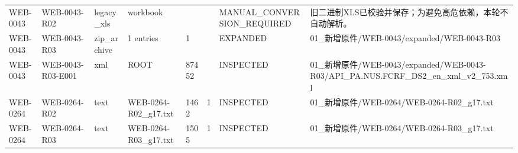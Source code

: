 \begin{landscape}
\begin{longtable}{p{1.8cm}p{2.2cm}p{3.1cm}p{4.7cm}p{1.3cm}p{1.3cm}p{3.0cm}p{5.3cm}}
WEB-0043 & WEB-0043-R02 & legacy\_\allowbreak{}xls & workbook &  &  & MANUAL\_\allowbreak{}CONVERSION\_\allowbreak{}REQUIRED & 旧二进制XLS已校验并保存；为避免高危依赖，本轮不自动解析。\\
WEB-0043 & WEB-0043-R03 & zip\_\allowbreak{}archive & 1 entries & 1 &  & EXPANDED & 01\_\allowbreak{}新增原件/\allowbreak{}WEB-0043/\allowbreak{}expanded/\allowbreak{}WEB-0043-R03\\
WEB-0043 & WEB-0043-R03-E001 & xml & ROOT & 87452 &  & INSPECTED & 01\_\allowbreak{}新增原件/\allowbreak{}WEB-0043/\allowbreak{}expanded/\allowbreak{}WEB-0043-R03/\allowbreak{}API\_\allowbreak{}PA.NUS.FCRF\_\allowbreak{}DS2\_\allowbreak{}en\_\allowbreak{}xml\_\allowbreak{}v2\_\allowbreak{}753.xml\\
WEB-0264 & WEB-0264-R02 & text & WEB-0264-R02\_\allowbreak{}g17.txt & 1462 & 1 & INSPECTED & 01\_\allowbreak{}新增原件/\allowbreak{}WEB-0264/\allowbreak{}WEB-0264-R02\_\allowbreak{}g17.txt\\
WEB-0264 & WEB-0264-R03 & text & WEB-0264-R03\_\allowbreak{}g17.txt & 1505 & 1 & INSPECTED & 01\_\allowbreak{}新增原件/\allowbreak{}WEB-0264/\allowbreak{}WEB-0264-R03\_\allowbreak{}g17.txt\\
\bottomrule\end{longtable}\endgroup\end{landscape}

